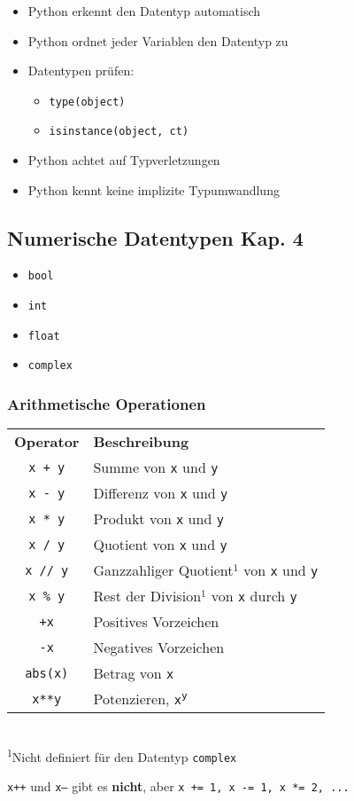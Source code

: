 \begin{itemize}
	\item Python erkennt den Datentyp automatisch
	\item Python ordnet jeder Variablen den Datentyp zu
	\item Datentypen prüfen:
	\begin{itemize}
		\item[\-] \texttt{type(object)}
		\item[\-] \texttt{isinstance(object, ct)}
	\end{itemize}
	\item Python achtet auf Typverletzungen
	\item Python kennt keine implizite Typumwandlung
\end{itemize}

\subsection[Numerische Datentypen]{Numerische Datentypen \tiny{Kap. 4}}
\begin{itemize}
	\item \texttt{bool}
	\item \texttt{int}
	\item \texttt{float}
	\item \texttt{complex}
\end{itemize}

\subsubsection{Arithmetische Operationen}
\begin{tabular}{|c|l|}
	\hline 
	\textbf{Operator} &\textbf{Beschreibung}\\ 
	\texttt{x + y} &Summe von \texttt{x} und \texttt{y}\\ 
	\texttt{x - y} &Differenz von \texttt{x} und \texttt{y}\\ 
	\texttt{x * y} &Produkt von \texttt{x} und \texttt{y}\\ 
	\texttt{x / y} &Quotient von \texttt{x} und \texttt{y}\\  
	\texttt{x // y} &Ganzzahliger Quotient$^1$ von \texttt{x} und \texttt{y}\\ 
	\texttt{x \% y} &Rest der Division$^1$ von \texttt{x} durch \texttt{y}\\ 
	\texttt{+x} &Positives Vorzeichen\\ 
	\texttt{-x} &Negatives Vorzeichen\\ 
	\texttt{abs(x)} &Betrag von \texttt{x}\\ 
	\texttt{x**y} &Potenzieren, \texttt{x\textsuperscript{y}}\\ 
	\hline 
\end{tabular}\\
\textsuperscript{1}Nicht definiert für den Datentyp \texttt{complex}\\
\begin{achtung}
	\texttt{x++} und \texttt{x--} gibt es \textbf{nicht}, aber \texttt{x += 1, x -= 1, x *= 2, ...}
\end{achtung}

